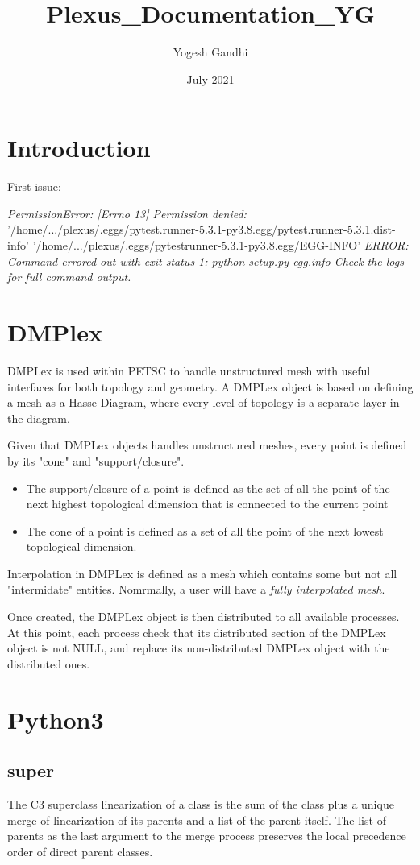 \documentclass{article}
\title{Plexus_Documentation_YG}
\author{Yogesh Gandhi}
\date{July 2021}
\begin{document}
\section{Introduction}
First issue:

\textit{PermissionError: [Errno 13] Permission denied:}
'/home/.../plexus/.eggs/pytest.runner-5.3.1-py3.8.egg/pytest.runner-5.3.1.dist-info' '/home/.../plexus/.eggs/pytestrunner-5.3.1-py3.8.egg/EGG-INFO'
\textit{ERROR: Command errored out with exit status 1: python setup.py egg.info Check the logs for full command output.}


\section{DMPlex}
DMPLex is used within PETSC to handle unstructured mesh with useful interfaces for both topology and geometry. A DMPLex object is based on defining a mesh as a Hasse Diagram, where every level of topology is a separate layer in the diagram.

Given that DMPLex objects handles unstructured meshes, every point is defined by its "cone" and "support/closure".

\begin{itemize}
    \item The support/closure of a point is defined as the set of all the point of the next highest topological dimension that is connected to the current point
    \item The cone of a point is defined as a set of all the point of the next lowest topological dimension.
\end{itemize}

Interpolation in DMPLex is defined as a mesh which contains some but not all "intermidate" entities. Nomrmally, a user will have a \textit{fully interpolated mesh}.

Once created, the DMPLex object is then distributed to all available processes. At this point, each process check that its distributed section of the DMPLex object is not NULL, and replace its non-distributed DMPLex object with the distributed ones.

\section{Python3}
\subsection{super}
The C3 superclass linearization of a class is the sum of the class plus a unique merge of linearization of its parents and a list of the parent itself. The list of parents as the last argument to the merge process preserves the local precedence order of direct parent classes.
\end{document}
